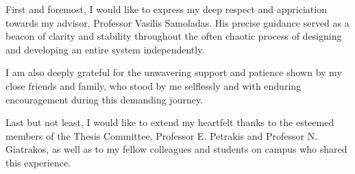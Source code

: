 \documentclass[
	12pt, %
	twoside,
	english,
	onehalfspacing, %
	liststotoc, %
	toctotoc, %
	parskip, %
	headsepline, %
	chapterinoneline, %
]{MastersDoctoralThesis} %
\begin{document}
\begin{acknowledgements}
	\addchaptertocentry{\acknowledgementname} %
	First and foremost, I would like to  express my deep respect and appriciation 
	towards my advisor, Professor Vasilis Samoladas. His precise guidance served 
	as a beacon of clarity and stability throughout the often chaotic process of 
	designing and developing an entire system independently.
	
	I am also deeply grateful for the unwavering support and patience shown by my 
	close friends and family, who stood by me selflessly and with enduring encouragement 
	during this demanding journey.

	Last but not least, I would like to extend my heartfelt thanks to the esteemed members 
	of the Thesis Committee, Professor E. Petrakis and Professor N. Giatrakos, as well as 
	to my fellow colleagues and students on campus who shared this experience.

\end{acknowledgements}


\tableofcontents %
\listoffigures %
\listoftables %
\listofalgorithms%

\end{document}
